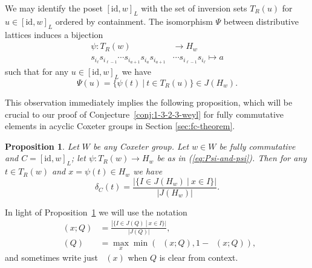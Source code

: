 \documentclass{amsart}
\DeclareMathOperator{\di}{\delta^{\text{ideal}}}
\DeclareMathOperator{\bi}{\textit{b}^{\text{ideal}}}
\newcommand{\id}{\mathrm{id}}
\newtheorem{prop}[theorem]{Proposition}
\theoremstyle{definition}
\theoremstyle{remark}
\begin{document}
We may identify the poset $[\id,w]_L$ with the set of inversion sets $T_R(u)$ for $u \in [\id,w]_L$ ordered by containment. The isomorphism $\Psi$ between distributive lattices induces a bijection
\begin{align}
\label{eq:Psi-and-psi}
\psi: T_R(w) &\to H_w  \\
s_{i_{\ell}}s_{i_{\ell-1}}\cdots s_{i_{a+1}} s_{i_a} s_{i_{a+1}} &\cdots s_{i_{\ell-1}} s_{i_{\ell}} \mapsto a \nonumber
\end{align}
such that for any $u \in [\id,w]_L$ we have
\[
\Psi(u)=\{\psi(t) \: | \: t \in T_R(u)\} \in J(H_w).
\]

This observation immediately implies the following proposition, which will be crucial to our proof of Conjecture~\ref{conj:1-3-2-3-weyl} for fully commutative elements in acyclic Coxeter groups in Section \ref{sec:fc-theorem}.

\begin{prop}
\label{prop:inversion-fraction-equals-ideal-fraction}
Let $W$ be any Coxeter group. Let $w\in W$ be fully commutative and $C=[\id,w]_L$; let $\psi: T_R(w) \to H_w$ be as in (\ref{eq:Psi-and-psi}).  Then for any $t \in T_R(w)$ and $x=\psi(t) \in H_w$ we have
\[
\delta_C(t)=\frac{|\{I \in J(H_w) \: | \: x \in I\}|}{|J(H_w)|}.
\]

\end{prop}

In light of Proposition~\ref{prop:inversion-fraction-equals-ideal-fraction} we will use the notation
\begin{align*}
    \di(x; Q) &= \frac{|\{I \in J(Q) \: | \: x \in I\}|}{|J(Q)|}, \\
    \bi(Q) &= \max_x \min(\di(x; Q), 1-\di(x; Q)),
\end{align*}
and sometimes write just $\di(x)$ when $Q$ is clear from context.
\end{document}
